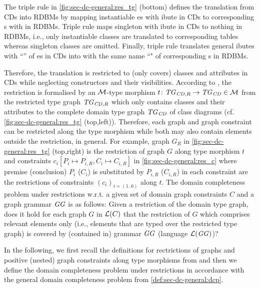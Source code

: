 The triple rule  in \cref{fig:sec-dc-general:res_tg} (bottom) defines the translation from CDs into RDBMs by mapping instantiable es with ibute  in CDs to corresponding s with   in RDBMs.
Triple rule  maps singleton  with ibute  in CDs to nothing in RDBMs, i.e., only instantiable classes are translated to corresponding tables whereas singleton classes are omitted.
Finally, triple rule  translates general ibutes with  ``'' of es in CDs into  with the same name ``" of corresponding s in RDBMs.

Therefore, the translation is restricted to (only covers) classes and attributes in CDs while neglecting constructors and their visibilities.
According to \cite{DBLP:journals/corr/abs-1209-1436}, the restriction is formalised by an ${\cal M}$-type morphism $t\colon \mathit{TG}_{\mathit{CD},R} \to \mathit{TG}_\mathit{CD} \in {\cal M}$ from the restricted type graph $\mathit{TG}_{\mathit{CD},R}$ which only contains classes and their attributes to the complete domain type graph $\mathit{TG}_\mathit{CD}$ of class diagrams (cf. \cref{fig:sec-dc-general:res_tg} (top,left)).
Therefore, each graph and graph constraint can be restricted along the type morphism while both may also contain elements outside the restriction, in general.
For example, graph $G_R$ in \cref{fig:sec-dc-general:res_tg} (top,right) is the restriction of graph $G$ along type morphism $t$ and constraints $c_i[P_i \mapsto P_{i,R},C_i \mapsto C_{i,R}]$ in \cref{fig:sec-dc-general:res_c} where premise (conclusion) $P_i$ ($C_i$) is substituted by $P_{i,R}$ ($C_{i,R}$) in each constraint are the restrictions of constraints $(c_i)_{i=(1..6)}$ along $t$.
The domain completeness problem under restrictions w.r.t. a given set of domain graph constraints $C$ and a graph grammar $\mathit{GG}$ is as follows: Given a restriction of the domain type graph, does it hold for each graph $G$ in $\mathcal{L}(C)$ that the restriction of $G$ which comprises relevant elements only (i.e., elements that are typed over the restricted type graph) is covered by (contained in) grammar $\mathit{GG}$ (language $\mathcal{L}(\mathit{GG})$)?

In the following, we first recall the definitions for rectrictions of graphs and positive (nested) graph constraints along type morphisms from \cite{DBLP:journals/corr/abs-1209-1436} and then we define the domain completeness problem under restrictions in accordance with the general domain completeness problem from \cref{def:sec-dc-general:dcp}.

